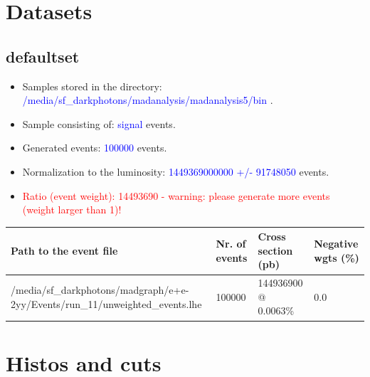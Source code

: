 \documentclass[a4paper, 11pt]{article}
\begin{document}
\section{ Datasets}

\subsection{ defaultset}

\begin{itemize}
  \item Samples stored in the directory: \textcolor{blue}{/\-media/\-sf\_darkphotons/\-madanalysis/\-madanalysis5/\-bin} .
   \item Sample consisting of: \textcolor{blue}{signal}  events.
   \item Generated events: \textcolor{blue}{100000 }  events.
   \item Normalization to the luminosity: \textcolor{blue}{1449369000000}\textcolor{blue}{ +/\-- }\textcolor{blue}{91748050 }  events.
   \item\textcolor{red}{Ratio (event weight): }\textcolor{red}{14493690 }\textcolor{red}{ - warning: please generate more events (weight larger than 1)!}
\textcolor{red}{}
\end{itemize}
\begin{table}[!h]
  \begin{center}
    \begin{tabular}{|m{51.0mm}|m{24.0mm}|m{28.0mm}|m{28.0mm}|}
      \hline
      \cellcolor{yellow}         Path to the event file& \cellcolor{yellow}         Nr. of events& \cellcolor{yellow}         Cross section (pb)& \cellcolor{yellow}         Negative wgts (\%)\\
      \hline
      \cellcolor{white}          /\-media/\-sf\_darkphotons/\-madgraph/\-e+e-2yy/\-Events/\-run\_11/\-unweighted\_events.lhe& \cellcolor{white}          100000& \cellcolor{white}          144936900 @ 0.0063\%& \cellcolor{white}          0.0\\
\hline
    \end{tabular}
  \end{center}
\end{table}

\newpage
\section{ Histos and cuts}
\end{document}

